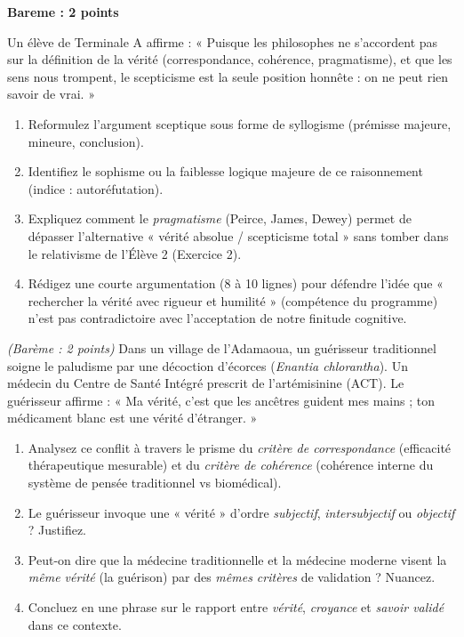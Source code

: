 \documentclass[11pt]{article}
\begin{document}
\begin{exercice}
\textbf{Bareme : 2 points}

Un élève de Terminale A affirme : « Puisque les philosophes ne s'accordent pas sur la définition de la vérité (correspondance, cohérence, pragmatisme), et que les sens nous trompent, le scepticisme est la seule position honnête : on ne peut rien savoir de vrai. »

\begin{enumerate}
    \item Reformulez l'argument sceptique sous forme de syllogisme (prémisse majeure, mineure, conclusion).
    \item Identifiez le sophisme ou la faiblesse logique majeure de ce raisonnement (indice : autoréfutation).
    \item Expliquez comment le \textit{pragmatisme} (Peirce, James, Dewey) permet de dépasser l'alternative « vérité absolue / scepticisme total » sans tomber dans le relativisme de l'Élève 2 (Exercice 2).
    \item Rédigez une courte argumentation (8 à 10 lignes) pour défendre l'idée que « rechercher la vérité avec rigueur et humilité » (compétence du programme) n'est pas contradictoire avec l'acceptation de notre finitude cognitive.
\end{enumerate}
\end{exercice}

\providecommand{\bareme}[1]{\textit{(Barème : #1 points)}}
\begin{exercice}
\bareme{2}
Dans un village de l'Adamaoua, un guérisseur traditionnel soigne le paludisme par une décoction d'écorces (\textit{Enantia chlorantha}). Un médecin du Centre de Santé Intégré prescrit de l'artémisinine (ACT). Le guérisseur affirme : « Ma vérité, c'est que les ancêtres guident mes mains ; ton médicament blanc est une vérité d'étranger. »

\begin{enumerate}
    \item Analysez ce conflit à travers le prisme du \textit{critère de correspondance} (efficacité thérapeutique mesurable) et du \textit{critère de cohérence} (cohérence interne du système de pensée traditionnel vs biomédical).
    \item Le guérisseur invoque une « vérité » d'ordre \textit{subjectif}, \textit{intersubjectif} ou \textit{objectif} ? Justifiez.
    \item Peut-on dire que la médecine traditionnelle et la médecine moderne visent la \textit{même vérité} (la guérison) par des \textit{mêmes critères} de validation ? Nuancez.
    \item Concluez en une phrase sur le rapport entre \textit{vérité}, \textit{croyance} et \textit{savoir validé} dans ce contexte.
\end{enumerate}
\end{exercice}
\end{document}
